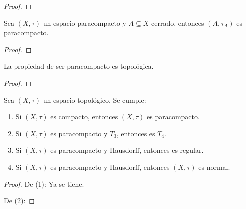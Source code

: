 \documentclass[12pt]{report}
\theoremstyle{largebreak}
\begin{document}
    \begin{proof}
        
    \end{proof}

    \begin{propo}
        Sea $(X,\tau)$ un espacio paracompacto y $A\subseteq X$ cerrado, entonces $(A,\tau_A)$ es paracompacto.
    \end{propo}

    \begin{proof}
        
    \end{proof}

    \begin{propo}
        La propiedad de ser paracompacto es topológica.
    \end{propo}

    \begin{proof}
        
    \end{proof}

    \begin{propo}
        Sea $(X,\tau)$ un espacio topológico. Se cumple:
        \begin{enumerate}
            \item Si $(X,\tau)$ es compacto, entonces $(X,\tau)$ es paracompacto.
            \item Si $(X,\tau)$ es paracompacto y $T_3$, entonces es $T_4$.
            \item Si $(X,\tau)$ es paracompacto y Hausdorff, entonces es regular.
            \item Si $(X,\tau)$ es paracompacto y Hausdorff, entonces $(X,\tau)$ es normal.
        \end{enumerate}
    \end{propo}

    \begin{proof}
        
        De (1): Ya se tiene.
        
        De (2): 

    \end{proof}
\end{document}
